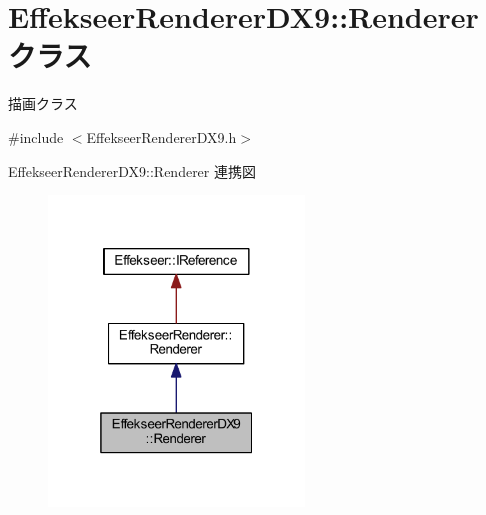 \hypertarget{class_effekseer_renderer_d_x9_1_1_renderer}{}\section{Effekseer\+Renderer\+D\+X9\+:\+:Renderer クラス}
\label{class_effekseer_renderer_d_x9_1_1_renderer}


描画クラス  




{\ttfamily \#include $<$Effekseer\+Renderer\+D\+X9.\+h$>$}



Effekseer\+Renderer\+D\+X9\+:\+:Renderer 連携図\nopagebreak
\begin{figure}[H]
\begin{center}
\leavevmode
\includegraphics[width=193pt]{class_effekseer_renderer_d_x9_1_1_renderer__coll__graph}
\end{center}
\end{figure}
